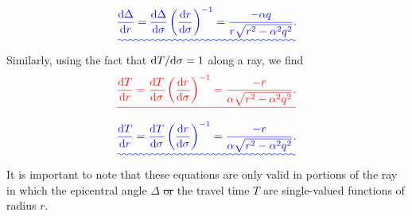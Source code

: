 \documentclass [a4paper,12pt]{paper}
\providecommand{\DIFadd}[1]{{\protect\color{blue}\uwave{#1}}} %
\providecommand{\DIFdel}[1]{{\protect\color{red}\sout{#1}}}                      %
\providecommand{\DIFaddbegin}{} %
\providecommand{\DIFaddend}{} %
\providecommand{\DIFdelbegin}{} %
\providecommand{\DIFdelend}{} %
\begin{document}
\DIFdelend \DIFaddbegin \begin{equation}
\DIFadd{\frac{\ddns \Delta}{\ddns r}=\frac{\ddns \Delta}{\ddns\sigma}\left(\frac{\ddns r}{\ddns \sigma}\right)^{-1}=\frac{-\alpha q}{r\sqrt{r^{2}-\alpha^{2}q^{2}}}.
\label{eq:14}
}\end{equation}\DIFaddend 
Similarly, using the fact that $\mathrm{d} T/\mathrm{d} \sigma=1$ along a ray, we find
\DIFdelbegin \begin{displaymath}
\DIFdel{\frac{\ddns T}{\ddns r}=\frac{\ddns T}{\ddns \sigma}\left(\frac{\ddns r}{\ddns \sigma}\right)^{-1}=\frac{-r}{\alpha\sqrt{r^{2}-\alpha^{2}q^{2}}}.
}\end{displaymath}%
\DIFdelend \DIFaddbegin \begin{equation}
\DIFadd{\frac{\ddns T}{\ddns r}=\frac{\ddns T}{\ddns \sigma}\left(\frac{\ddns r}{\ddns \sigma}\right)^{-1}=\frac{-r}{\alpha\sqrt{r^{2}-\alpha^{2}q^{2}}}.
\label{eq:15}
}\end{equation}\DIFaddend 
It is important to note that these equations are only valid in portions of the ray in which the epicentral angle $\Delta$ \DIFdelbegin \DIFdel{or }\DIFdelend \DIFaddbegin \DIFadd{and }\DIFaddend the travel time $T$ are single-valued functions of \DIFaddbegin \DIFadd{the }\DIFaddend radius $r$.
\end{document}
